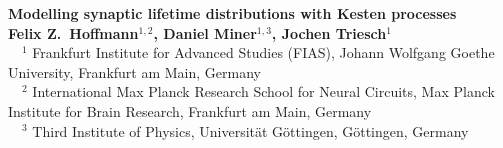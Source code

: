 \documentclass[a0,landscape]{a0poster}
\begin{document}


\begin{minipage}[b]{0.75\linewidth}
\vspace{-0.5cm}   
  \veryHuge \textbf{Modelling synaptic lifetime distributions with Kesten processes} \color{Black}\\[1.5cm] 
  \huge \textbf{Felix Z.~Hoffmann$^{1,2}$, Daniel Miner$^{1,3}$, Jochen Triesch$^1$}\\[0.5cm] %
\large $\quad ^1$ Frankfurt Institute for Advanced Studies (FIAS), Johann Wolfgang Goethe University, Frankfurt am Main, Germany\\[0.2cm] %
$\quad ^2$ International Max Planck Research School for Neural Circuits, Max Planck Institute for Brain Research, Frankfurt am Main, Germany\\[0.2cm]
$\quad ^3$ Third Institute of Physics, Universität Göttingen, Göttingen, Germany
\\[0.4cm]
\end{minipage}
%
\end{document}
